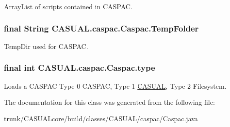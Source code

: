 Array\-List of scripts contained in C\-A\-S\-P\-A\-C. \hypertarget{class_c_a_s_u_a_l_1_1caspac_1_1_caspac_afb6992f335be11e10621da46afb23459}{
\subsubsection[{Temp\-Folder}]{\setlength{\rightskip}{0pt plus 5cm}final String C\-A\-S\-U\-A\-L.\-caspac.\-Caspac.\-Temp\-Folder}}\label{class_c_a_s_u_a_l_1_1caspac_1_1_caspac_afb6992f335be11e10621da46afb23459}
Temp\-Dir used for C\-A\-S\-P\-A\-C. \hypertarget{class_c_a_s_u_a_l_1_1caspac_1_1_caspac_a1fa7fccdf284c0b71c45004978d8c7d4}{
\subsubsection[{type}]{\setlength{\rightskip}{0pt plus 5cm}final int C\-A\-S\-U\-A\-L.\-caspac.\-Caspac.\-type}}\label{class_c_a_s_u_a_l_1_1caspac_1_1_caspac_a1fa7fccdf284c0b71c45004978d8c7d4}
Loads a C\-A\-S\-P\-A\-C Type 0 C\-A\-S\-P\-A\-C, Type 1 \hyperlink{namespace_c_a_s_u_a_l}{C\-A\-S\-U\-A\-L}, Type 2 Filesystem. 

The documentation for this class was generated from the following file\-:\begin{DoxyCompactItemize}
\item 
trunk/\-C\-A\-S\-U\-A\-Lcore/build/classes/\-C\-A\-S\-U\-A\-L/caspac/Caspac.\-java\end{DoxyCompactItemize}
